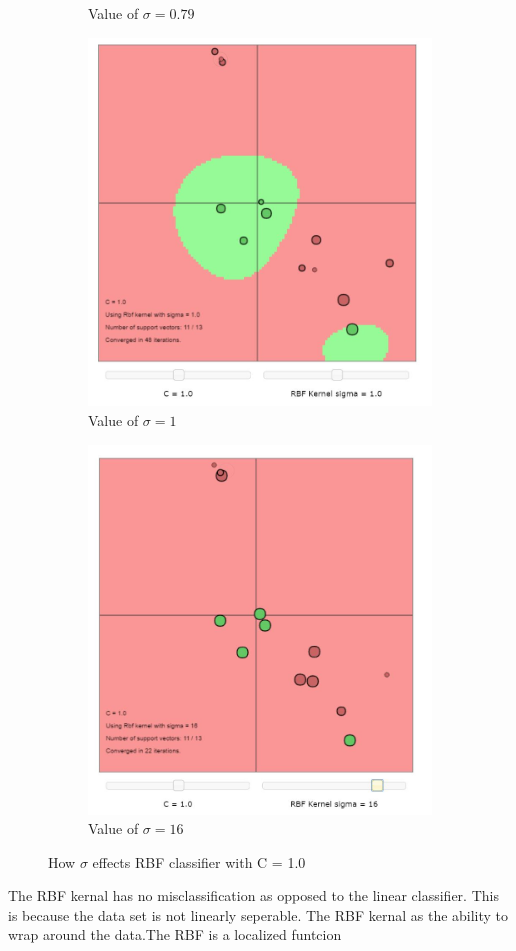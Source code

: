 \documentclass[11pt,oneside,a4paper]{article}
\begin{document}
\begin{figure}[h!]
\begin{subfigure}{.25\textwidth}
 		\caption{Value of $\sigma = 0.79$}
 		\label{fig:rbfs2}
 	\end{subfigure}%
 	\begin{subfigure}{.25\textwidth}
 		\centering
 		\includegraphics[width=0.9\linewidth]{../Figures/RBF_sigma_1}
 		\caption{Value of $\sigma = 1$}
 		\label{fig:rbfs3}
 	\end{subfigure}%
 	\begin{subfigure}{.25\textwidth}
 		\centering
		\includegraphics[width=0.9\linewidth]{../Figures/RBF_sigma_16}
 		\caption{Value of $\sigma = 16$}
 		\label{fig:rfbs4}
 	\end{subfigure}
 	\caption{How $\sigma$ effects RBF classifier with C = 1.0}
 	\label{fig:RBF_sigma}
 \end{figure}

 The RBF kernal has no misclassification as opposed to the linear classifier. This is because the data set is not linearly seperable. The RBF kernal as the ability to wrap around the data.The RBF is a localized funtcion
 
\end{document}
